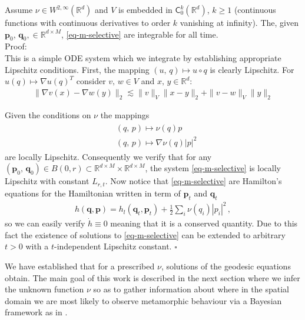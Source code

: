 \documentclass[runningheads]{llncs}
\newcommand{\norm}[2]{\| #1 \|_{ #2 }}
\newcommand{\vnorm}[1]{\norm{ #1 }{V}}
\newcommand{\ltwonorm}[1]{\norm{ #1 }{2}}
\newcommand{\Rd}{\mathbb{R}^{d}}
\newcommand{\RdM}{\mathbb{R}^{d\times M}}
\begin{document}
\begin{theorem}
Assume $\nu \in W^{2, \infty}(\Rd)$ and $V$ is embedded in
$\textsf{C}_0^k(\Rd)$, $k\geq 1$ (continuous functions with continuous
derivatives to order $k$ vanishing at infinity). The, given $\mathbf
p_0,\,\mathbf q_0, \in \RdM$, \eqref{eq-m-selective} are integrable for all
time.\\

Proof:\\

This is a simple ODE system which we integrate by establishing appropriate
Lipschitz conditions. First, the mapping $(u,\,q)\mapsto u\circ q$ is clearly 
Lipschitz. For $u(q)\mapsto\nabla u(q)^T$ consider $v,\,w \in V$ and
$x,\,y\in\Rd$:
\begin{align}
\ltwonorm{\nabla v(x) - \nabla w(y)} \lesssim \vnorm{v} \ltwonorm{x-y} + \vnorm{v-w}\ltwonorm{y}
\end{align}

Given the conditions on $\nu$ the mappings
\begin{align}
  \begin{split}
    & (q,\,p)\mapsto \nu(q)p\\
    &(q,\,p)\mapsto \nabla \nu(q)|p|^2
  \end{split}\label{nu_maps}
\end{align}
are locally Lipschitz. Consequently we verify that for any $(\mathbf
p_0,\,\mathbf q_0)\in B(0,r)\subset \RdM\times\RdM$, the system
\eqref{eq-m-selective} is locally Lipschitz with constant $L_{r,t}$.
Now notice that \eqref{eq-m-selective} are Hamilton's equations for the
Hamiltonian written in term of $\mathbf p_t$ and $\mathbf q_t$
\begin{align}
  h(\mathbf q, \mathbf p) = h_l(\mathbf q_t,\mathbf p_t)+\frac12\sum_i\nu(q_i) |p_i|^2\,,  
\end{align}
so we can easily verify $\dot h \equiv 0$ meaning that it is a conserved
quantity. Due to this fact the existence of solutions to \eqref{eq-m-selective}
can be extended to arbitrary $t>0$ with a $t$-independent Lipschitz constant.
{\hfill $\square$}
\end{theorem}

We have established that for a prescribed $\nu$, solutions of the geodesic
equations obtain. The main goal of this work is described in the next section
where we infer the unknown function $\nu$ so as to gather information about
where in the spatial domain we are most likely to observe metamorphic behaviour
via a Bayesian framework as in \cite{dashti2017bayesian}.
\end{document}
